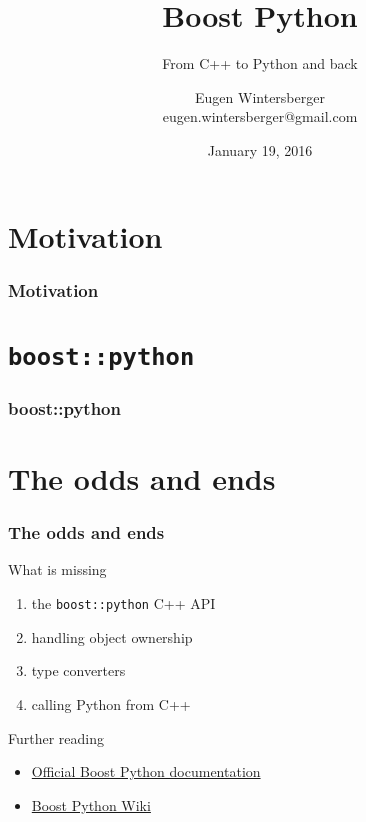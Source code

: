\documentclass{beamer}
\title{{\Huge Boost Python}}
\subtitle{From C++ to Python and back}
\author{Eugen Wintersberger\\ \small{eugen.wintersberger@gmail.com}}
\date{January 19, 2016}
\begin{document}
\frame{\titlepage}
\part{Motivation}
\section{Motivation}


\part{\texttt{boost::python}}
\section{boost::python}
\frame{\partpage}


\part{The odds and ends}
\section{The odds and ends}
\frame{\partpage}

\begin{frame}[fragile]{What is missing}
    \begin{enumerate}
        \item the \texttt{boost::python} C++ API
        \item handling object ownership
        \item type converters
        \item calling Python from C++
    \end{enumerate}
\end{frame}

\begin{frame}[fragile]{Further reading}

    \begin{itemize}
        \item
            \href{http://www.boost.org/doc/libs/1_60_0/libs/python/doc/html/index.html}
            {Official Boost Python documentation}
        \item 
            \href{https://wiki.python.org/moin/boost.python}
            {Boost Python Wiki}
    \end{itemize}

\end{frame}
\end{document}
